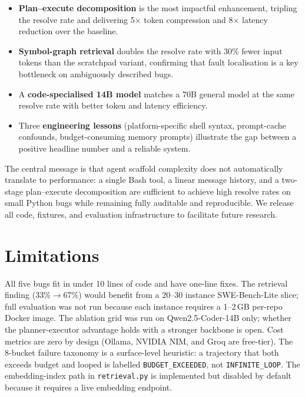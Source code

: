 \documentclass[11pt]{article}
\begin{document}
\begin{itemize}
  \item \textbf{Plan--execute decomposition} is the most impactful enhancement,
        tripling the resolve rate and delivering 5$\times$ token compression
        and 8$\times$ latency reduction over the baseline.
  \item \textbf{Symbol-graph retrieval} doubles the resolve rate with
        30\% fewer input tokens than the scratchpad variant, confirming
        that fault localisation is a key bottleneck on ambiguously described bugs.
  \item A \textbf{code-specialised 14B model} matches a 70B general model
        at the same resolve rate with better token and latency efficiency.
  \item Three \textbf{engineering lessons} (platform-specific shell syntax,
        prompt-cache confounds, budget-consuming memory prompts) illustrate
        the gap between a positive headline number and a reliable system.
\end{itemize}

The central message is that agent scaffold complexity does not automatically
translate to performance: a single Bash tool, a linear message history, and
a two-stage plan--execute decomposition are sufficient to achieve high resolve
rates on small Python bugs while remaining fully auditable and reproducible.
We release all code, fixtures, and evaluation infrastructure to facilitate
future research.

\section*{Limitations}

All five bugs fit in under 10 lines of code and have one-line fixes.  The
retrieval finding (33\%$\to$67\%) would benefit from a 20--30 instance
SWE-Bench-Lite slice; full evaluation was not run because each instance
requires a 1--2\,GB per-repo Docker image.  The ablation grid was run on
Qwen2.5-Coder-14B only; whether the planner-executor advantage holds with a
stronger backbone is open.  Cost metrics are zero by design (Ollama, NVIDIA
NIM, and Groq are free-tier).  The 8-bucket failure taxonomy is a
surface-level heuristic: a trajectory that both exceeds budget and looped is
labelled \texttt{BUDGET\_EXCEEDED}, not \texttt{INFINITE\_LOOP}.  The
embedding-index path in \texttt{retrieval.py} is implemented but disabled by
default because it requires a live embedding endpoint.
\end{document}
